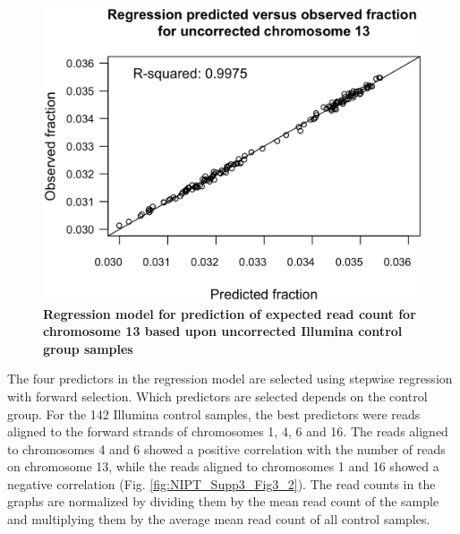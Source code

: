 \begin{figure}[h]
	\includegraphics[width=0.8\linewidth]{img/NIPT_Supp3_Fig3_1}
	\caption[Example of regression model chromosome 13]{\textbf{Regression model for prediction of expected read count for chromosome 13 based upon uncorrected Illumina control group samples}}
	\label{fig:NIPT_Supp3_Fig3_1}
\end{figure}

\noindent The four predictors in the regression model are selected using stepwise regression with forward selection. 
Which predictors are selected depends on the control group. For the 142 Illumina control samples, the best predictors were reads aligned to the forward strands of chromosomes 1, 4, 6 and 16. 
The reads aligned to chromosomes 4 and 6 showed a positive correlation with the number of reads on chromosome 13, while the reads aligned to chromosomes 1 and 16 showed a negative correlation (Fig.  \ref{fig:NIPT_Supp3_Fig3_2}).
The read counts in the graphs are normalized by dividing them by the mean read count of the sample and multiplying them by the average mean read count of all control samples.

